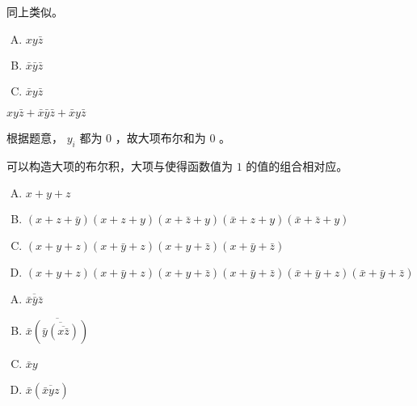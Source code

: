 {{        %
        \begin{practices}
            同上类似。
        \end{practices}

        \begin{practices}
            \begin{enumerate}[A.]
                \item $xy\bar{z}$
                \item $\bar{x}\bar{y}\bar{z}$
                \item $\bar{x}y\bar{z}$
            \end{enumerate}
        \end{practices}

        \begin{practices}
            $xy\bar{z} + \bar{x}\bar{y}\bar{z} + \bar{x}y\bar{z}$
        \end{practices}

        \begin{practices}
            根据题意， $y_i$ 都为 $0$ ，故大项布尔和为 $0$ 。
        \end{practices}

        \begin{practices}
            可以构造大项的布尔积，大项与使得函数值为 $1$ 的值的组合相对应。
        \end{practices}

        \begin{practices}
            \begin{enumerate}[A.]
                \item $x + y + z$
                \item $(x + z + \bar{y})(x + z + y)(x + \bar{z} + y)(\bar{x} + z + y)(\bar{x} + \bar{z} + y)$
                \item $(x + y + z)(x + \bar{y} + z)(x + y + \bar{z})(x + \bar{y} + \bar{z})$
                \item $(x + y + z)(x + \bar{y} + z)(x + y + \bar{z})(x + \bar{y} + \bar{z})(\bar{x} + \bar{y} + z)(\bar{x} + \bar{y} + \bar{z})$
            \end{enumerate}
        \end{practices}

        \begin{practices}
            \begin{enumerate}[A.]
                \item $\overline{\bar{x}\bar{y}\bar{z}}$
                \item $\overline{\bar{x}(\overline{\bar{y}(\overline{x\bar{z}})})}$
                \item $\bar{x}y$
                \item $\bar{x}(\overline{\bar{x}yz})$
            \end{enumerate}
        \end{practices}

}}
